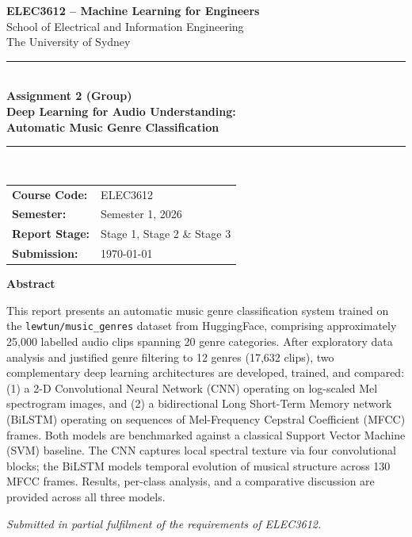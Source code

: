 \documentclass[12pt, a4paper]{article}
\begin{document}
\begin{titlepage}
    \centering
    \vspace*{1.5cm}

    {\Large \textbf{ELEC3612 -- Machine Learning for Engineers}}\\[0.4cm]
    {\large School of Electrical and Information Engineering}\\[0.2cm]
    {\large The University of Sydney}\\[1.5cm]

    \rule{\linewidth}{1pt}\\[0.5cm]
    {\LARGE \textbf{Assignment 2 (Group)}}\\[0.3cm]
    {\Large \textbf{Deep Learning for Audio Understanding:}}\\[0.2cm]
    {\Large \textbf{Automatic Music Genre Classification}}\\[0.3cm]
    \rule{\linewidth}{1pt}\\[1.5cm]

    \begin{tabular}{ll}
        \textbf{Course Code:}   & ELEC3612 \\[4pt]
        \textbf{Semester:}      & Semester 1, 2026 \\[4pt]
        \textbf{Report Stage:}  & Stage 1, Stage 2 \& Stage 3 \\[4pt]
        \textbf{Submission:}    & \today \\
    \end{tabular}

    \vspace{2.5cm}

    {\large \textbf{Abstract}}\\[0.4cm]
    \begin{minipage}{0.88\textwidth}
    \small
    \setlength{\parskip}{4pt}
    This report presents an automatic music genre classification system trained on the     \texttt{lewtun/music\_genres} dataset from HuggingFace, comprising approximately
    25{,}000 labelled audio clips spanning 20 genre categories. After exploratory data
    analysis and justified genre filtering to 12 genres (17{,}632 clips), two complementary
    deep learning architectures are developed, trained, and compared: (1) a 2-D
    Convolutional Neural Network (CNN) operating on log-scaled Mel spectrogram images, and
    (2) a bidirectional Long Short-Term Memory network (BiLSTM) operating on sequences of
    Mel-Frequency Cepstral Coefficient (MFCC) frames. Both models are benchmarked against
    a classical Support Vector Machine (SVM) baseline. The CNN captures local spectral
    texture via four convolutional blocks; the BiLSTM models temporal evolution of musical
    structure across 130 MFCC frames. Results, per-class analysis, and a comparative
    discussion are provided across all three models.
    \end{minipage}

    \vfill
    {\small \textit{Submitted in partial fulfilment of the requirements of ELEC3612.}}
\end{titlepage}
\end{document}
